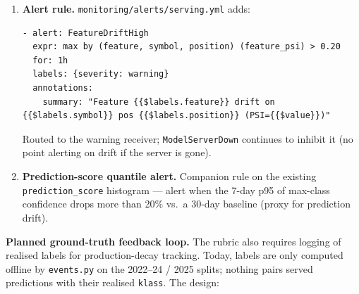 \documentclass[11pt,a4paper]{article}
\begin{document}
\begin{enumerate}[leftmargin=1.5em,itemsep=0pt]
\begin{lstlisting}[style=bashstyle]
feature_psi{feature="det_z_score", symbol="BAJFINANCE", position="0"} 0.084
feature_psi{feature="det_spread",  symbol="BAJFINANCE", position="0"} 0.231
\end{lstlisting}
  The \texttt{symbol} and \texttt{position} labels are required by the per-symbol model boundary --- a $0.20$ PSI on RELIANCE pos 1 must not silently average with BAJFINANCE pos 0 (per the per-symbol-model architecture decision in Section~\ref{sec:archdec}, \emph{Per-symbol models, not pooled}).
  \item \textbf{Alert rule.} \texttt{monitoring/alerts/serving.yml} adds:
\begin{lstlisting}[style=bashstyle]
- alert: FeatureDriftHigh
  expr: max by (feature, symbol, position) (feature_psi) > 0.20
  for: 1h
  labels: {severity: warning}
  annotations:
    summary: "Feature {{$labels.feature}} drift on {{$labels.symbol}} pos {{$labels.position}} (PSI={{$value}})"
\end{lstlisting}
  Routed to the warning receiver; \texttt{ModelServerDown} continues to inhibit it (no point alerting on drift if the server is gone).
  \item \textbf{Prediction-score quantile alert.} Companion rule on the existing \texttt{prediction\_score} histogram --- alert when the 7-day p95 of max-class confidence drops more than 20\% vs.\ a 30-day baseline (proxy for prediction drift).
\end{enumerate}

\textbf{Planned ground-truth feedback loop.} The rubric also requires logging of realised labels for production-decay tracking. Today, labels are only computed offline by \texttt{events.py} on the 2022--24 / 2025 splits; nothing pairs served predictions with their realised \texttt{klass}. The design:
\end{document}
